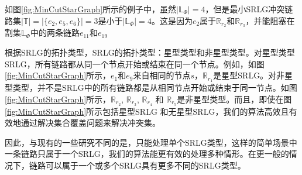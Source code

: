 如图\ref{fig:MinCutStarGraph}所示的例子中，虽然$|\mathbb{L}_{\Phi}|=4$，但是最小SRLG冲突链路集$|\mathbb{T}|=|\{e_2, e_5, e_6 \}|=3$是小于$|\mathbb{L}_{\Phi}|=4$。这是因为$e_2$属于$\mathbb{R}_{r_2}$和$\mathbb{R}_{r_3}$，并能阻塞在割集$\mathbb{L}_{\Phi}$中的两条链路$e_{11}$和$e_{19}$


根据SRLG的拓扑类型\cite{datta2008graph}，SRLG的拓扑类型：星型类型和非星型类型。对星型类型SRLG，所有链路都从同一个节点开始或结束在同一个节点。例如，如图\ref{fig:MinCutStarGraph}所示，$e_1$和$e_9$来自相同的节点$s$，$\mathbb{R}_{r_1}$是星型SRLG。对非星型类型，并不是SRLG中的所有链路都是从相同节点开始或结束于同一节点。如图\ref{fig:MinCutStarGraph}所示，$\mathbb{R}_{r_2}$, $\mathbb{R}_{r_3}$, $\mathbb{R}_{r_4}$ 和 $\mathbb{R}_{r_5}$是非星型类型。而且，即使在图\ref{fig:MinCutStarGraph}所示包括星型SRLG 和无星型SRLG，我们的算法高效且有效地通过解决集合覆盖问题来解决冲突集。


因此，与现有的一些研究不同的是，\cite{datta2008graph}只能处理单个SRLG类型，这样的简单场景中一条链路只属于一个SRLG，我们的算法能更有效的处理多种情形。在更一般的情况下，链路可以属于一个或多个SRLG具有更多不同的SRLG类型。

